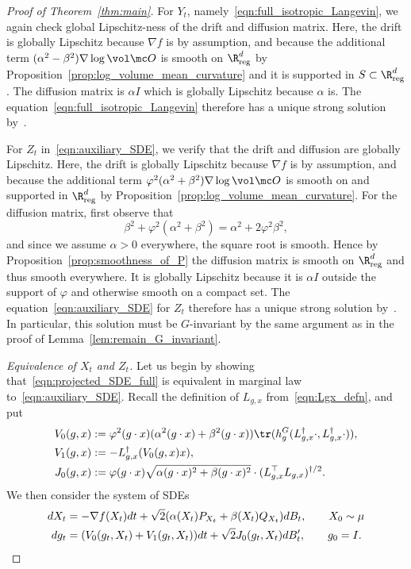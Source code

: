 \documentclass[twoside,a4paper,11pt]{article}
\renewcommand{\phi}{\varphi}
\newcommand{\reg}{\mathrm{reg}}
\theoremstyle{plain}
\begin{document}
\begin{proof}[Proof of Theorem~\ref{thm:main}]
For $Y_t$, namely~\eqref{eqn:full_isotropic_Langevin},
we again check global Lipschitz-ness of the
drift and diffusion matrix. Here, the drift is globally
Lipschitz because $\nabla f$ is by assumption, and because
the additional term $(\alpha^2 - \beta^2)\nabla \log\vol \mc O$
is smooth on $\R^d_{\reg}$ by 
Proposition~\ref{prop:log_volume_mean_curvature}
and it is supported in $S\subset \R^d_{\reg}$.
The diffusion matrix is $\alpha I$ which
is globally Lipschitz because
$\alpha$ is.
The equation~\eqref{eqn:full_isotropic_Langevin}
therefore has a unique strong solution by~\cite[Theorem 5.2.1]{oksendal2013stochastic}.


For $Z_t$ in~\eqref{eqn:auxiliary_SDE}, we 
verify that the drift and diffusion are globally
Lipschitz. 
Here, the drift is globally
Lipschitz because $\nabla f$ is by assumption, and because
the additional term $\phi^2(\alpha^2 + \beta^2)\nabla \log\vol \mc O$
is smooth on and supported in $\R^d_{\reg}$ by 
Proposition~\ref{prop:log_volume_mean_curvature}.
For the diffusion matrix, first observe that
$$
\beta^2 + \phi^2(\alpha^2 + \beta^2)=
\alpha^2 + 2\phi^2\beta^2,
$$ and since we assume $\alpha > 0$ everywhere,
the square root is smooth.
Hence by Proposition~\ref{prop:smoothness_of_P}
the diffusion matrix is smooth on $\R^d_{\reg}$
and thus smooth everywhere. It is globally
Lipschitz because it is $\alpha I$ outside the support of $\phi$
and otherwise smooth on a compact set.
The equation~\eqref{eqn:auxiliary_SDE}
for $Z_t$
therefore has a unique strong solution by~\cite[Theorem 5.2.1]{oksendal2013stochastic}.
In particular, this solution must be $G$-invariant
by the same argument as in the proof of Lemma~\ref{lem:remain_G_invariant}.

{\it Equivalence of $X_t$ and $Z_t$.} Let us begin by showing that~\eqref{eqn:projected_SDE_full}
is equivalent in marginal law to~\eqref{eqn:auxiliary_SDE}.
Recall the definition of $L_{g,x}$ from~\eqref{eqn:Lgx_defn},
and put
\begin{align*}
V_0(g, x) &:=\phi^2(g\cdot x)(\alpha^2(g\cdot x) + \beta^2(g\cdot x)) \tr(h_{g}^G(L_{g, x}^{\dagger}
    \cdot, L_{g, x}^{\dagger} \cdot)),\\
    V_1(g, x) &:= -L_{g, x}^{\dagger}(V_0(g, x)x), \\
    J_0(g, x) &:= \phi(g\cdot x) \sqrt{\alpha(g\cdot x)^2 + \beta(g \cdot x)^2} \cdot
    (L_{g, x}^\top L_{g, x})^{\dagger/2}.
\end{align*}
We then consider the system of SDEs
\begin{align}
dX_t &= -\nabla f(X_t)dt + \sqrt{2}(\alpha(X_t) P_{X_t}
+ \beta(X_t) Q_{X_t}) dB_t, \quad \quad X_0 \sim \mu \notag \\
    dg_t &= (V_0(g_t, X_t) + V_1(g_t, X_t))dt
    + \sqrt{2}J_0(g_t, X_t)dB_t', \quad \quad g_0 = I.
    \label{eqn:full_gt_dynamics}
    \end{align}


\end{proof}
\end{document}
